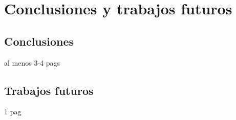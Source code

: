 \chapter{Conclusiones y trabajos futuros}


\section{Conclusiones}

al menos 3-4 pags

\clearpage



\section{Trabajos futuros}

1 pag
